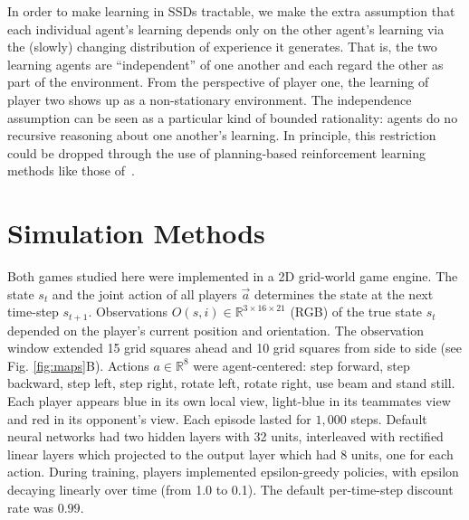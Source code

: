 \documentclass{aamas2017}
\begin{document}
In order to make learning in SSDs tractable, we make the extra assumption that each individual agent's learning depends only on the other agent's learning via the (slowly) changing distribution of experience it generates. That is, the two learning agents are ``independent'' of one another and each regard the other as part of the environment. From the perspective of player one, the learning of player two shows up as a non-stationary environment. The independence assumption can be seen as a particular kind of bounded rationality: agents do no recursive reasoning about one another's learning. In principle, this restriction could be dropped through the use of planning-based reinforcement learning methods like those of~\cite{kleimanWeiner2016}.


\section{Simulation Methods}\label{sec:methods}
Both games studied here were implemented in a 2D grid-world game engine. The state $s_t$ and the joint action of all players $\vec{a}$ determines the state at the next time-step $s_{t+1}$. Observations $O(s,i) \in \mathbb{R}^{3 \times 16 \times 21}$ (RGB) of the true state $s_t$ depended on the player's current position and orientation. The observation window extended 15 grid squares ahead and 10 grid squares from side to side (see Fig. \ref{fig:maps}B). Actions $a \in \mathbb{R}^8$ were agent-centered: step forward, step backward, step left, step right, rotate left, rotate right, use beam and stand still. Each player appears blue in its own local view, light-blue in its teammates view and red in its opponent's view. Each episode lasted for $1,000$ steps. Default neural networks had two hidden layers with 32 units, interleaved with rectified linear layers which projected to the output layer which had 8 units, one for each action. During training, players implemented epsilon-greedy policies, with epsilon decaying linearly over time (from 1.0 to 0.1). The default  per-time-step discount rate was $0.99$.
\end{document}
